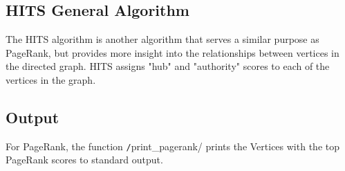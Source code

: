 \documentclass[12pt, titlepage, twoside]{amsart}
\theoremstyle{remark}
\begin{document}
\subsection{HITS General Algorithm}

The HITS algorithm is another algorithm that serves a similar purpose as PageRank,
but provides more insight into the relationships between vertices in the directed graph.
HITS assigns "hub" and "authority" scores to each of the vertices in the graph.


\subsection{Output}

For PageRank, the function \texttt/print_pagerank/ prints the Vertices with the top PageRank scores to standard output.





\end{document}
